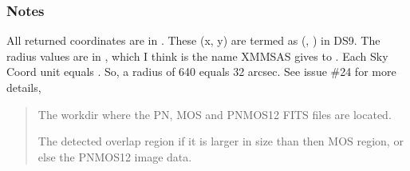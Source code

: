 \documentclass[letterpaper,10pt,english]{sphinxmanual}
\begin{document}
\begin{fulllineitems}
\begin{fulllineitems}
\subsubsection*{Notes}

\sphinxAtStartPar
All returned coordinates are in .
These (x, y) are termed as (, ) in DS9.
The radius values are in , which I think is the name XMMSAS gives
to . Each Sky Coord unit equals .
So, a radius of 640 equals 32 arcsec.
See issue \#24 for more details, 

\end{fulllineitems}


\begin{fulllineitems}
\label{\detokenize{xmmPipeline:xmmPipeline.findOverlap.findOverlap.obtainOverlap}}
\pysigstartsignatures
{}
\pysigstopsignatures\begin{quote}\begin{description}
\sphinxAtStartPar
The workdir where the PN, MOS and PNMOS12 FITS files are located.

\sphinxAtStartPar
The detected overlap region if it is larger in size than then MOS region,
or else the PNMOS12 image data.

\end{description}\end{quote}

\end{fulllineitems}


\end{fulllineitems}


\begin{fulllineitems}
\label{\detokenize{xmmPipeline:xmmPipeline.findOverlap.imageMOS12}}
\pysigstartsignatures
{}
\pysigstopsignatures
\end{fulllineitems}
\end{document}

